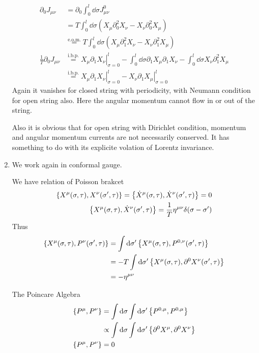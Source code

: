 \begin{enumerate}[label=(\alph*)]
		\begin{align*}
			\partial_0 J_{\mu\nu} &= \partial_0 \int_0^l \dd{\sigma} J_{\mu\nu}^0\\ 
										 &= T \int_0^l \dd{\sigma} \left( X_\mu \partial_0^2 X_\nu - X_\nu \partial_0^2 X_\mu \right) \\
										 &\stackrel{\text{e.o.m.}}{=} T \int_0^l \dd{\sigma} \left( X_\mu \partial_1^2 X_\nu - X_\nu \partial_1^2 X_\mu \right) \\
			\frac{1}{T} \partial_0 J_{\mu\nu} &\stackrel{\text{i.b.p.}}{=}  \left.X_\mu \partial_1 X_\nu\right|_{\sigma=0}^{l} - \int_0^l \dd{\sigma} \partial_1 X_\mu \partial_1 X_\nu - \int_0^l \dd{\sigma} X_\nu \partial_1^2 X_\mu \\
														 &\stackrel{\text{i.b.p.}}{=} \left.X_\mu \partial_1 X_\nu\right|_{\sigma=0}^{l} - \left. X_\nu \partial_1 X_\mu \right|_{\sigma=0}^{l}
		\end{align*}
		Again it vanishes for closed string with periodicity, with Neumann condition for open string also. Here the angular momentum cannot flow in or out of the string.
	
		Also it is obvious that for open string with Dirichlet condition, momentum and angular momentum currents are not necessarily conserved. It has something to do with its explicite volation of Lorentz invariance.

	\item We work again in conformal gauge. 

		We have relation of Poisson brakcet
		\begin{align*}
			\acomm{X^\mu(\sigma, \tau)}{X^\nu (\sigma', \tau)} = \acomm{\dot{X}^\mu(\sigma, \tau)}{\dot{X}^\nu(\sigma', \tau)} = 0 \\
			\acomm{X^\mu(\sigma, \tau)}{\dot{X}^\nu(\sigma', \tau)} = \frac{1}{T}\eta^{\mu\nu}\delta(\sigma-\sigma')
		\end{align*}
		Thus 
		\begin{align*}
			\acomm{X^\mu(\sigma, \tau)}{P^\nu(\sigma', \tau)} &= \int \dd{\sigma'} \acomm{X^\mu(\sigma, \tau)}{P^{0,\nu}(\sigma', \tau)} \\
																			  &= -T \int \dd{\sigma'} \acomm{X^\mu(\sigma, \tau)}{\partial^0 X^\nu(\sigma', \tau)} \\
																			  &= -\eta^{\mu\nu}
		\end{align*}

		The Poincare Algebra
		\begin{align}
			\acomm{P^\mu}{P^\nu} &= \int \dd{\sigma} \int \dd{\sigma'} \acomm{P^{0,\mu}}{P^{0,\mu}} \notag \\
										&\propto  \int \dd{\sigma} \int \dd{\sigma'} \acomm{\partial^0 X^\mu}{\partial^0 X^\nu}  \notag \\
			\acomm{P^\mu}{P^\nu}	&= 0
		\end{align}
	

\end{enumerate}
